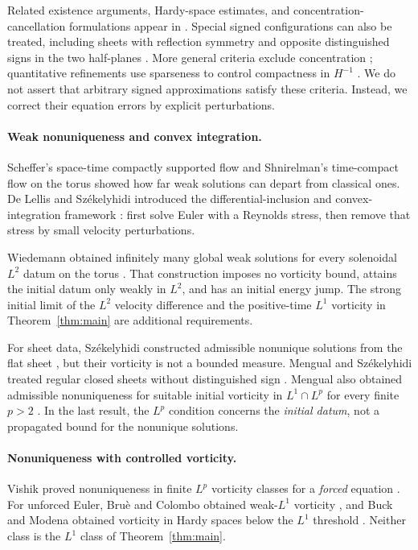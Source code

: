 \documentclass[11pt,a4paper,reqno]{amsart}
\theoremstyle{plain}
\theoremstyle{definition}
\theoremstyle{remark}
\numberwithin{equation}{section}
\begin{document}
Related existence arguments, Hardy-space estimates, and
concentration-cancellation formulations appear in
\cite{Majda,EvansMuller,Schochet}. Special signed configurations can
also be treated, including sheets with reflection symmetry and
opposite distinguished signs in the two half-planes
\cite{Reflection}. More general criteria exclude concentration
\cite{NoConcentration}; quantitative refinements use sparseness to
control compactness in $H^{-1}$ \cite{Sparseness}. We do not assert
that arbitrary signed approximations satisfy these criteria. Instead,
we correct their equation errors by explicit perturbations.

\paragraph{Weak nonuniqueness and convex integration.}
Scheffer's space-time compactly supported flow \cite{Scheffer} and
Shnirelman's time-compact flow on the torus \cite{Shnirelman}
showed how far weak solutions can depart from classical ones.
De Lellis and Sz\'ekelyhidi introduced the differential-inclusion and
convex-integration framework \cite{DLS09,DLS10}: first solve Euler
with a Reynolds stress, then remove that stress by small velocity
perturbations.

Wiedemann obtained infinitely many global weak solutions for every
solenoidal $L^2$ datum on the torus \cite[Theorem~1]{Wiedemann}.
That construction imposes no vorticity bound, attains the initial
datum only weakly in $L^2$, and has an initial energy jump. The strong
initial limit of the $L^2$ velocity difference and the positive-time
$L^1$ vorticity in Theorem~\ref{thm:main} are additional requirements.

For sheet data, Sz\'ekelyhidi constructed admissible nonunique
solutions from the flat sheet \cite{SzekelyhidiSheet}, but their
vorticity is not a bounded measure. Mengual and Sz\'ekelyhidi treated
regular closed sheets without distinguished sign
\cite{MengualSzekelyhidi}. Mengual also obtained admissible
nonuniqueness for suitable initial vorticity in $L^1\cap L^p$ for
every finite $p>2$ \cite{Mengual}. In the last result, the $L^p$
condition concerns the \emph{initial datum}, not a propagated bound
for the nonunique solutions.

\paragraph{Nonuniqueness with controlled vorticity.}
Vishik proved nonuniqueness in finite $L^p$ vorticity classes for a
\emph{forced} equation \cite{VishikI,VishikII}. For unforced Euler,
Bru\`e and Colombo obtained weak-$L^1$ vorticity
\cite{BrueColombo}, and Buck and Modena obtained vorticity in Hardy
spaces below the $L^1$ threshold \cite{BuckModena}. Neither class
is the $L^1$ class of Theorem~\ref{thm:main}.
\end{document}
